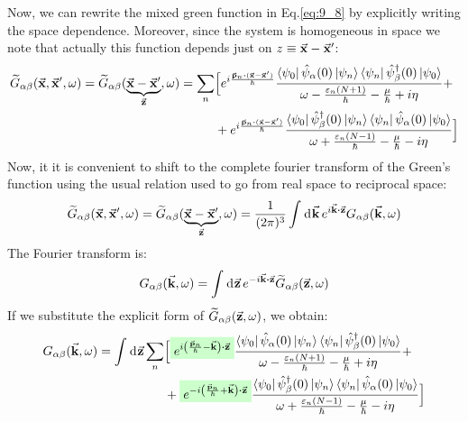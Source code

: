 \documentclass[../main/main.tex]{subfiles}
\begin{document}
Now, we can rewrite the mixed green function in Eq.\eqref{eq:9_8} by explicitly writing the space dependence. Moreover, since the system is homogeneous in space we note that actually this function depends just on \( z \equiv \va{x}-\va{x}' \):
\begin{equation*}
\begin{split}
\widetilde{G}_{\alpha \beta } (\va{x},\va{x}', \omega )   =
 \widetilde{G}_{\alpha \beta } (\underbrace{\va{x}-\va{x}'}_{\va{z}}, \omega )
 =
\sum_{n}^{} &\Big[
e^{i \frac{\va{p}_n \vdot (\va{x}-\va{x}')}{\hbar }}
\frac{\bra{\psi _0} \hat{\psi }_ \alpha
 (0) \ket{\psi _n} \bra{\psi _n} \hat{\psi }_ \beta ^\dag (0) \ket{\psi _0}  }{\omega - \frac{\varepsilon _n (N+1)}{\hbar } - \frac{\mu }{\hbar } + i \eta }
  + \\
&
+ e^{i \frac{\va{p}_n \vdot (\va{x}-\va{x}')}{\hbar }}
 \frac{\bra{\psi _0} \hat{\psi }_ \beta ^\dag (0) \ket{\psi _n} \bra{\psi _n}  \hat{\psi }_ \alpha
 (0)  \ket{\psi _0}  }{  \omega + \frac{\varepsilon _n (N-1)}{\hbar } - \frac{\mu }{\hbar } - i \eta }
 \Big]
\end{split}
\end{equation*}
Now, it it is convenient to shift to the complete fourier transform of the Green's function using the usual relation used to go from real space to reciprocal space:
\begin{equation*}
  \widetilde{G}_{\alpha \beta } (\va{x},\va{x}', \omega )   =
   \widetilde{G}_{\alpha \beta } (\underbrace{\va{x}-\va{x}'}_{\va{z}}, \omega )
   = \frac{1}{(2 \pi )^3} \int_{}^{} \dd[]{\va{k}}
   e^{i \va{k} \vdot \va{z}} G_{\alpha \beta } (\va{k}, \omega )
\end{equation*}
The Fourier transform is:
\begin{equation*}
  \begin{split}
  G_{\alpha \beta } (\va{k}, \omega )
  = \int_{}^{} \dd[]{\va{z}} e^{-i \va{k}\vdot \va{z}} \widetilde{G}_{\alpha \beta } (\va{z},\omega )
  \end{split}
\end{equation*}
If we substitute the explicit form of \(  \widetilde{G}_{\alpha \beta } (\va{z},\omega ) \), we obtain:
\begin{equation}
  \begin{split}
  G_{\alpha \beta } (\va{k}, \omega )
  =  \int_{}^{} \dd[]{\va{z}} \sum_{n}^{} &
  \Big[
  \mathcolorbox{green!20}{e^{i \qty(\frac{\va{p}_n}{\hbar }-\va{k})\vdot \va{z} }}
  \frac{\bra{\psi _0} \hat{\psi }_ \alpha
   (0) \ket{\psi _n} \bra{\psi _n} \hat{\psi }_ \beta ^\dag (0) \ket{\psi _0}  }{\omega - \frac{\varepsilon _n (N+1)}{\hbar } - \frac{\mu }{\hbar } + i \eta }
   +
  \\
  &+ \mathcolorbox{green!20}{e^{-i \qty(\frac{\va{p}_n}{\hbar }+\va{k})\vdot \va{z} }}
  \frac{\bra{\psi _0} \hat{\psi }_ \beta ^\dag (0) \ket{\psi _n} \bra{\psi _n}  \hat{\psi }_ \alpha
  (0)  \ket{\psi _0}  }{  \omega + \frac{\varepsilon _n (N-1)}{\hbar } - \frac{\mu }{\hbar } - i \eta } \Big]
  \end{split}
  \label{eq:10_3}
\end{equation}
\end{document}
